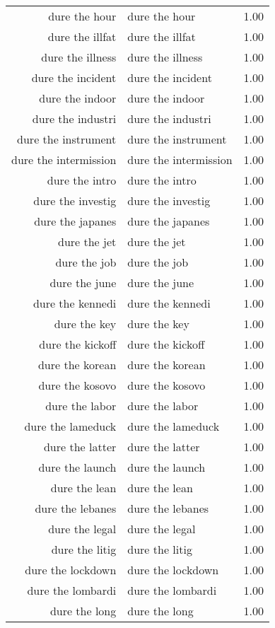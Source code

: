 \begin{table}[ht]
\begin{tabular}{rlr}
  dure the hour & dure the hour & 1.00 \\ 
  dure the illfat & dure the illfat & 1.00 \\ 
  dure the illness & dure the illness & 1.00 \\ 
  dure the incident & dure the incident & 1.00 \\ 
  dure the indoor & dure the indoor & 1.00 \\ 
  dure the industri & dure the industri & 1.00 \\ 
  dure the instrument & dure the instrument & 1.00 \\ 
  dure the intermission & dure the intermission & 1.00 \\ 
  dure the intro & dure the intro & 1.00 \\ 
  dure the investig & dure the investig & 1.00 \\ 
  dure the japanes & dure the japanes & 1.00 \\ 
  dure the jet & dure the jet & 1.00 \\ 
  dure the job & dure the job & 1.00 \\ 
  dure the june & dure the june & 1.00 \\ 
  dure the kennedi & dure the kennedi & 1.00 \\ 
  dure the key & dure the key & 1.00 \\ 
  dure the kickoff & dure the kickoff & 1.00 \\ 
  dure the korean & dure the korean & 1.00 \\ 
  dure the kosovo & dure the kosovo & 1.00 \\ 
  dure the labor & dure the labor & 1.00 \\ 
  dure the lameduck & dure the lameduck & 1.00 \\ 
  dure the latter & dure the latter & 1.00 \\ 
  dure the launch & dure the launch & 1.00 \\ 
  dure the lean & dure the lean & 1.00 \\ 
  dure the lebanes & dure the lebanes & 1.00 \\ 
  dure the legal & dure the legal & 1.00 \\ 
  dure the litig & dure the litig & 1.00 \\ 
  dure the lockdown & dure the lockdown & 1.00 \\ 
  dure the lombardi & dure the lombardi & 1.00 \\ 
  dure the long & dure the long & 1.00 \\ 

\end{tabular}
\end{table}
